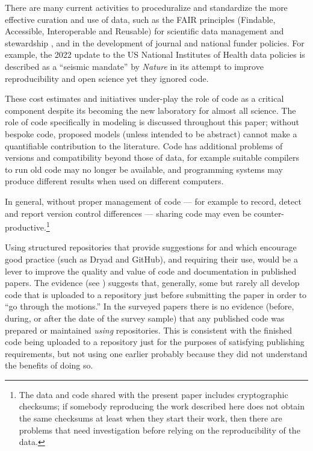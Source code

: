 \documentclass{comjnl}
\begin{document}
There are many current activities to proceduralize and standardize the more effective curation and use of data, such as the FAIR principles (Findable, Accessible, Interoperable and Reusable) for scientific data management and stewardship \cite{fair,fair-principles}, and in the development of journal and national funder policies. For example, the 2022 update to the US National Institutes of Health data policies \cite{nih-policy} is described as a ``seismic mandate'' by \emph{Nature\/} \cite{nih-nature} in its attempt to improve reproducibility and open science yet they ignored code.

These cost estimates and initiatives under-play the role of code as a critical component despite its becoming the new laboratory for almost all science. The role of code specifically in modeling is discussed throughout this paper; without bespoke code, proposed models (unless intended to be abstract) cannot make a quantifiable contribution to the literature. Code has additional problems of versions and compatibility beyond those of data, for example suitable compilers to run old code may no longer be available, and  programming systems may produce different results when used on different computers. 

In general, without proper management of code --- for example to record, detect and report version control differences --- sharing code may even be counter-productive.\footnote{The data and code shared with the present paper includes cryptographic checksums; if somebody reproducing the work described here does not obtain the same checksums at least when they start their work, then there are problems that need investigation before relying on the reproducibility of the data.}

Using structured repositories that provide suggestions for and which encourage good practice (such as Dryad and GitHub), and requiring their use, would be a lever to improve the quality and value of code and documentation in published papers. The evidence (see \supplement) suggests that, generally, some but rarely all develop code that is uploaded to a repository just before submitting the paper in order to ``go through the motions.'' In the surveyed papers there is no evidence (before, during, or after the date of the survey sample) that any published code was prepared or maintained \emph{using\/} repositories. This is consistent with the finished code being uploaded to a repository just for the purposes of satisfying publishing requirements, but not using one earlier probably because they did not understand the benefits of doing so. 
\end{document}
